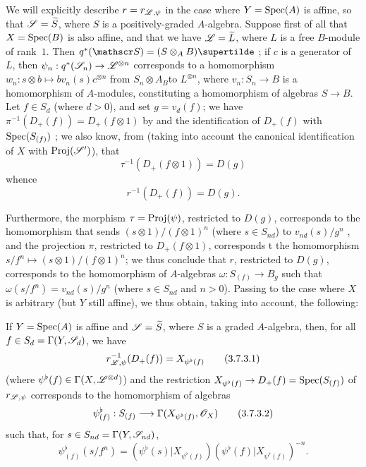 \begin{env}[3.7.2]
\label{II.3.7.2}
We will explicitly describe $r=r_{\mathscr{L},\psi}$ in the case where $Y={\mathop{\mathrm{Spec}}\nolimits}(A)$ is affine, so that $\mathscr{S}=\widetilde{S}$, where $S$ is a positively-graded $A$-algebra.
Suppose first of all that $X={\mathop{\mathrm{Spec}}\nolimits}(B)$ is also affine, and that we have $\mathscr{L}=\widetilde{L}$, where $L$ is a free $B$-module of rank~$1$.
Then $q^*(\sh{S})=(S\otimes_A B)\supertilde$ ;
if $c$ is a generator of $L$, then $\psi_n:q^*(\sh{S}_n)\to\sh{L}^{\otimes n}$ corresponds to a homomorphism $w_n:s\otimes b\mapsto bv_n(s)c^{\otimes n}$ from $S_n\otimes A_ B$to $L^{\otimes n}$, where $v_n:S_n\to B$ is a homomorphism of $A$-modules, constituting a homomorphism of algebras $S\to B$.
Let $f\in S_d$ (where $d>0$), and set $g=v_d(f)$;
we have $\pi^{-1}(D_+(f))=D_+(f\otimes1)$ by  and the identification of $D_+(f)$ with ${\mathop{\mathrm{Spec}}\nolimits}(S_{(f)})$ ;
we also know, from  (taking into account the canonical identification of $X$ with ${\mathop{\mathrm{Proj}}\nolimits}(\mathscr{S}')$), that
\[
  \tau^{-1}(D_+(f\otimes1)) = D(g)
\]
whence
\[
\label{II.3.7.2.1}
  r^{-1}(D_+(f)) = D(g).
\tag{3.7.2.1}
\]

Furthermore, the morphism $\tau={\mathop{\mathrm{Proj}}\nolimits}(\psi)$, restricted to $D(g)$, corresponds to the homomorphism that sends $(s\otimes1)/(f\otimes1)^n$ (where $s\in S_{nd}$) to $v_{nd}(s)/g^n$ , and the projection $\pi$, restricted to $D_+(f\otimes1)$, corresponds t the homomorphism $s/f^n\mapsto(s\otimes1)/(f\otimes1)^n$;
we thus conclude that $r$, restricted to $D(g)$, corresponds to the homomorphism of $A$-algebras $\omega:S_{(f)}\to B_g$ such that $\omega(s/f^n)=v_{nd}(s)/g^n$ (where $s\in S_{nd}$ and $n>0$).
Passing to the case where $X$ is arbitrary (but $Y$ still affine), we thus obtain, taking  into account, the following:
\end{env}

\begin{proposition}[3.7.3]
\label{II.3.7.3}
If $Y={\mathop{\mathrm{Spec}}\nolimits}(A)$ is affine and $\mathscr{S}=\widetilde{S}$, where $S$ is a graded $A$-algebra, then, for all $f\in S_d=\Gamma(Y,\mathscr{S}_d)$, we have
\[
\label{II.3.7.3.1}
  r_{\mathscr{L},\psi}^{-1}(D_+(f)) = X_{\psi^\flat(f)}
\tag{3.7.3.1}
\]
(where $\psi^\flat(f)\in\Gamma(X,\mathscr{L}^{\otimes d})$) and the restriction $X_{\psi^\flat(f)}\to D_+(f)=\Spec(S_{(f)})$ of $r_{\mathscr{L},\psi}$ corresponds  to the homomorphism of algebras
\[
\label{II.3.7.3.2}
  \psi_{(f)}^\flat : S_{(f)} \to \Gamma(X_{\psi^\flat(f)},\sh{O}_X)
\tag{3.7.3.2}
\]
such that, for $s\in S_{nd}=\Gamma(Y,\mathscr{S}_{nd})$,
\[
\label{II.3.7.3.3}
  \psi_{(f)}^\flat(s/f^n) = (\psi^\flat(s)|X_{\psi^\flat(f)})(\psi^\flat(f)|X_{\psi^\flat(f)})^{-n}.
\tag{3.7.3.3}
\]
\end{proposition}

